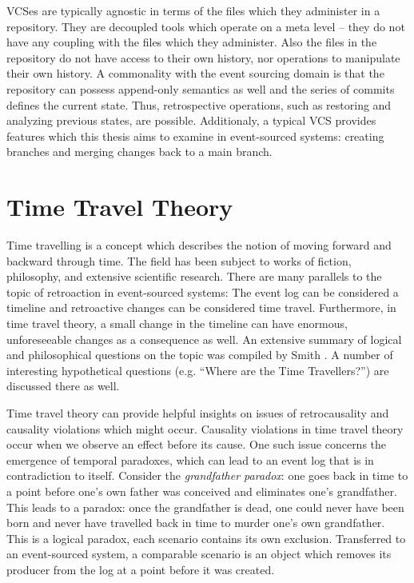 VCSes are typically agnostic in terms of the files which they administer in a 
repository. They are decoupled tools which operate on a meta level -- they do not 
have any coupling with the files which they administer. Also the files in the 
repository do not have access to their own history, nor operations to manipulate 
their own history.
A commonality with the event sourcing domain is that the repository can possess 
append-only semantics as well and the series of commits defines the current 
state. Thus, retrospective operations, such as restoring and analyzing previous 
states, are possible. Additionaly, a typical VCS provides features which this 
thesis aims to examine in event-sourced systems: creating branches and merging 
changes back to a main branch.


\section{Time Travel Theory}
\label{sec:time-travel-theory}
Time travelling is a concept which describes the notion of moving forward and 
backward through time. The field has been subject to works of fiction, philosophy, 
and extensive scientific research.
There are many parallels to the topic of retroaction in event-sourced systems: 
The event log can be considered a timeline and retroactive changes can be 
considered time travel. Furthermore, in time travel theory, a small change in 
the timeline can have enormous, unforeseeable changes as a consequence as well. 
%
An extensive summary of logical and philosophical questions on the topic was 
compiled by Smith \cite{Smith2016}. 
%
A number of interesting hypothetical questions (e.g. ``Where are the Time 
Travellers?'') are discussed there as well.

Time travel theory can provide helpful insights on issues of retrocausality and 
causality violations which might occur. Causality violations in time travel 
theory occur when we observe an effect before its cause. One such issue concerns 
the emergence of temporal paradoxes, which can lead to an event log that is in 
contradiction to itself.
Consider the \emph{grandfather paradox}: one goes back in time to a point before 
one's own father was conceived and eliminates one's grandfather. This leads to a 
paradox: once the grandfather is dead, one could never have been born and never 
have travelled back in time to murder one's own grandfather. This is a logical 
paradox, each scenario contains its own exclusion. 
Transferred to an event-sourced system, a comparable scenario is an object which 
removes its producer from the log at a point before it was created.

